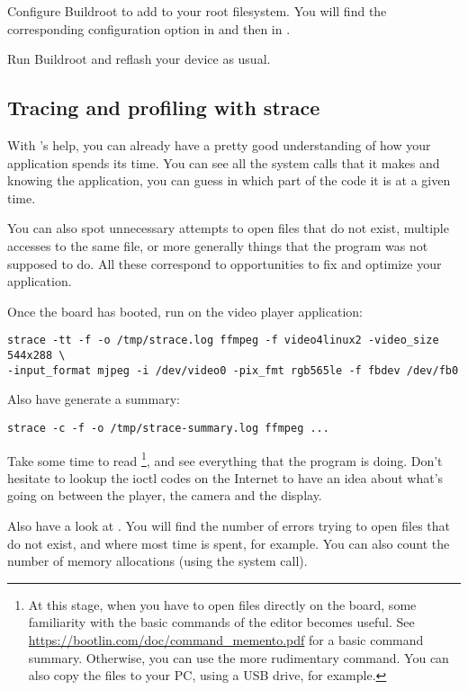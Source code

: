 Configure Buildroot to add  to your root
filesystem. You will find the corresponding configuration option in
 and then in .

Run Buildroot and reflash your device as usual.

\subsection{Tracing and profiling with strace}

With 's help, you can already have a pretty good understanding
of how your application spends its time. You can see all the system
calls that it makes and knowing the application, you can guess in which
part of the code it is at a given time.

You can also spot unnecessary attempts to open files that do not exist,
multiple accesses to the same file, or more generally things that the
program was not supposed to do. All these correspond to opportunities
to fix and optimize your application.

Once the board has booted, run  on the video player
application:

\begin{verbatim}
strace -tt -f -o /tmp/strace.log ffmpeg -f video4linux2 -video_size 544x288 \
-input_format mjpeg -i /dev/video0 -pix_fmt rgb565le -f fbdev /dev/fb0
\end{verbatim}

Also have  generate a summary:

\begin{verbatim}
strace -c -f -o /tmp/strace-summary.log ffmpeg ...
\end{verbatim}

Take some time to read \footnote{
At this stage, when you have to open files directly on the
board, some familiarity with the basic commands of the  editor
becomes useful. See
\url{https://bootlin.com/doc/command_memento.pdf} for a basic
command summary. Otherwise, you can use the more rudimentary 
command. You can also copy the files to your PC, using a USB drive, for
example.}, and see everything that the program is doing. Don't hesitate
to lookup the ioctl codes on the Internet to have an idea about what's
going on between the player, the camera and the display.

Also have a look at . You will find the number
of errors trying to open files that do not exist, and where most time is
spent, for example. You can also count the number of memory allocations
(using the \code{mmap2} system call).

